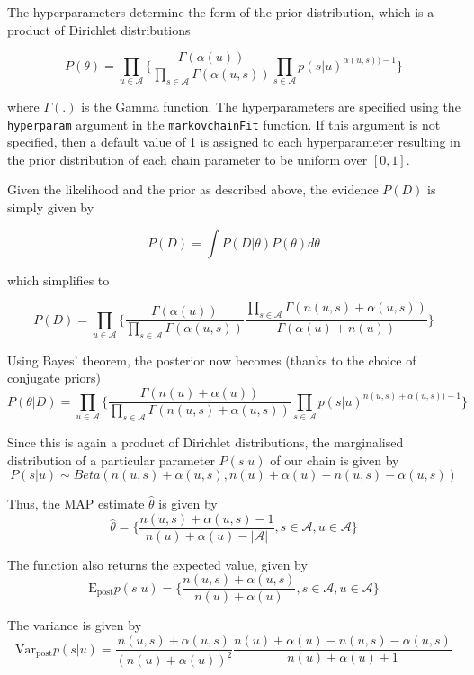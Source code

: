 \documentclass[article,nojss]{jss}
\begin{document}
The hyperparameters determine the form of the prior distribution, which is a product of Dirichlet distributions

\[P(\theta) = \prod_{u \in \mathcal{A}} \Big\{ \frac{\Gamma(\alpha(u))}{\prod_{s \in \mathcal{A}} \Gamma(\alpha(u, s))} \prod_{s \in \mathcal{A}} p(s|u)^{\alpha(u, s)) - 1} \Big\}\]

where \(\Gamma(.)\) is the Gamma function. The hyperparameters are specified using the \texttt{hyperparam} argument in the \texttt{markovchainFit} function. If this argument is not specified, then a default value of 1 is assigned to each hyperparameter resulting in the prior distribution of each chain parameter to be uniform over \([0,1]\).

Given the likelihood and the prior as described above, the evidence \(P(D)\) is simply given by

\[P(D) = \int P(D|\theta) P(\theta) d\theta\]

which simplifies to

\[
P(D) = \prod_{u \in \mathcal{A}} \Big\{ \frac{\Gamma(\alpha(u))}{\prod_{s \in \mathcal{A}} \Gamma(\alpha(u, s))} \frac{\prod_{s \in \mathcal{A}} \Gamma(n(u, s) + \alpha(u, s))}{\Gamma(\alpha(u) + n(u))} \Big\}
\]

Using Bayes' theorem, the posterior now becomes (thanks to the choice of conjugate priors)
\[
P(\theta | D) = \prod_{u \in \mathcal{A}} \Big\{ \frac{\Gamma(n(u) + \alpha(u))}{\prod_{s \in \mathcal{A}} \Gamma(n(u, s) + \alpha(u, s))} \prod_{s \in \mathcal{A}} p(s|u)^{n(u, s) + \alpha(u, s)) - 1} \Big\}
\]

Since this is again a product of Dirichlet distributions, the marginalised distribution of a particular parameter \(P(s|u)\) of our chain is given by
\[
P(s|u) \sim Beta(n(u, s) + \alpha(u, s), n(u) + \alpha(u) - n(u, s) - \alpha(u, s))
\]

Thus, the MAP estimate \(\hat{\theta}\) is given by
\[
\hat{\theta} = \Big\{ \frac{n(u, s) + \alpha(u, s) - 1}{n(u) + \alpha(u) - |\mathcal{A}|}, s \in \mathcal{A}, u \in \mathcal{A} \Big\}
\]

The function also returns the expected value, given by
\[
\text{E}_{\text{post}} p(s|u) = \Big\{ \frac{n(u, s) + \alpha(u, s)}{n(u) + \alpha(u)}, s \in \mathcal{A}, u \in \mathcal{A} \Big\}
\]

The variance is given by
\[
\text{Var}_{\text{post}} p(s|u) = \frac{n(u, s) + \alpha(u, s)}{(n(u) + \alpha(u))^2} \frac{n(u) + \alpha(u) - n(u, s) - \alpha(u, s)}{n(u) + \alpha(u) + 1}
\]
\end{document}

